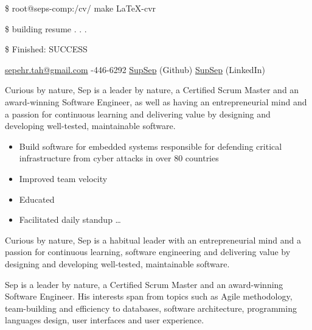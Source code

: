\documentclass[10pt,a4paper]{article}
\begin{document}
\sloppy{}  %

\noindent \$ root@seps-comp:/cv/ make LaTeX-cvr

\noindent \$ building resume . . . 

\noindent \$ Finished: SUCCESS


\vspace{2em}

\noindent\href{mailto:sepehr.tah.at.gmail.dot.com}{sepehr.tah\mbox{}@\mbox{}gmail.com}\sbull
{}-446-6292\sbull
\href{https://github.com/supsep}{SupSep} (Github) \sbull
\href{http://www.linkedin.com/in/supsep}{SupSep} (LinkedIn) 


\spacedhrule{0.9em}{-0.4em}  %


Curious by nature, Sep is a leader by nature, a Certified Scrum Master and an 
award-winning Software Engineer, as well as having an entrepreneurial
mind and a passion for continuous learning  and delivering value
by designing and developing well-tested, maintainable software.

\noindent\begin{itemize}  
\item Build software for embedded systems responsible for defending critical infrastructure from cyber attacks in over 80 countries
\item Improved team velocity
\item Educated
\item Facilitated daily standup \ldots 
\end{itemize}

Curious by nature, Sep is a habitual leader with an entrepreneurial
mind and a passion for continuous learning, software engineering and delivering value
by designing and developing well-tested, maintainable software.

 Sep is a leader by nature, a Certified Scrum Master and an award-winning Software Engineer. His interests span from topics such as Agile methodology, team-building and efficiency to databases, software architecture, programming languages design, user interfaces and user experience.
\end{document}
